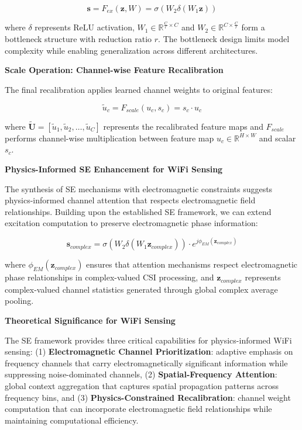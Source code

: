 \documentclass[journal]{IEEEtran}
\begin{document}
\begin{equation}
\mathbf{s} = F_{ex}(\mathbf{z}, W) = \sigma(W_2\delta(W_1\mathbf{z}))
\label{eq:se_excitation}
\end{equation}

where $\delta$ represents ReLU activation, $W_1 \in \mathbb{R}^{\frac{C}{r} \times C}$ and $W_2 \in \mathbb{R}^{C \times \frac{C}{r}}$ form a bottleneck structure with reduction ratio $r$. The bottleneck design limits model complexity while enabling generalization across different architectures.

\textbf{Scale Operation: Channel-wise Feature Recalibration}

The final recalibration applies learned channel weights to original features:

\begin{equation}
\tilde{u}_c = F_{scale}(u_c, s_c) = s_c \cdot u_c
\label{eq:se_scale}
\end{equation}

where $\tilde{\mathbf{U}} = [\tilde{u}_1, \tilde{u}_2, \ldots, \tilde{u}_C]$ represents the recalibrated feature maps and $F_{scale}$ performs channel-wise multiplication between feature map $u_c \in \mathbb{R}^{H \times W}$ and scalar $s_c$.

\textbf{Physics-Informed SE Enhancement for WiFi Sensing}

The synthesis of SE mechanisms with electromagnetic constraints suggests physics-informed channel attention that respects electromagnetic field relationships. Building upon the established SE framework, we can extend excitation computation to preserve electromagnetic phase information:

\begin{equation}
\mathbf{s}_{complex} = \sigma(W_2\delta(W_1\mathbf{z}_{complex})) \cdot e^{j\phi_{EM}(\mathbf{z}_{complex})}
\label{eq:se_physics_complex}
\end{equation}

where $\phi_{EM}(\mathbf{z}_{complex})$ ensures that attention mechanisms respect electromagnetic phase relationships in complex-valued CSI processing, and $\mathbf{z}_{complex}$ represents complex-valued channel statistics generated through global complex average pooling.

\textbf{Theoretical Significance for WiFi Sensing}

The SE framework provides three critical capabilities for physics-informed WiFi sensing: (1) \textbf{Electromagnetic Channel Prioritization}: adaptive emphasis on frequency channels that carry electromagnetically significant information while suppressing noise-dominated channels, (2) \textbf{Spatial-Frequency Attention}: global context aggregation that captures spatial propagation patterns across frequency bins, and (3) \textbf{Physics-Constrained Recalibration}: channel weight computation that can incorporate electromagnetic field relationships while maintaining computational efficiency.
\end{document}
